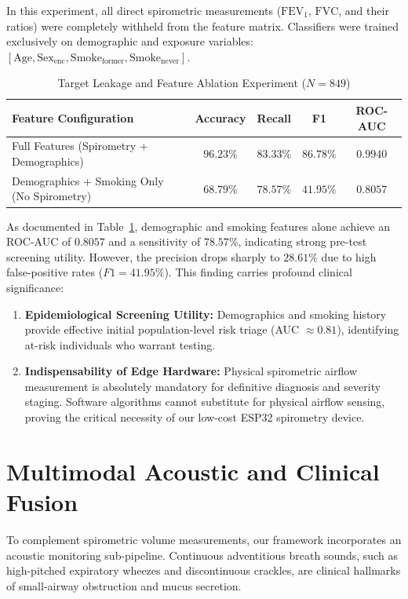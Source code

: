\documentclass[conference]{IEEEtran}
\begin{document}
In this experiment, all direct spirometric measurements ($\text{FEV}_1$, $\text{FVC}$, and their ratios) were completely withheld from the feature matrix. Classifiers were trained exclusively on demographic and exposure variables: $[\text{Age}, \text{Sex}_{\text{enc}}, \text{Smoke}_{\text{former}}, \text{Smoke}_{\text{never}}]$.

\begin{table}[h]
\caption{Target Leakage and Feature Ablation Experiment ($N=849$)}
\label{tab:leakage}
\centering
\begin{tabular}{lcccc}
\toprule
\textbf{Feature Configuration} & \textbf{Accuracy} & \textbf{Recall} & \textbf{F1} & \textbf{ROC-AUC} \\
\midrule
Full Features (Spirometry + Demographics) & $96.23\%$ & $83.33\%$ & $86.78\%$ & $0.9940$ \\
Demographics + Smoking Only (No Spirometry) & $68.79\%$ & $78.57\%$ & $41.95\%$ & $0.8057$ \\
\bottomrule
\end{tabular}
\end{table}

As documented in Table~\ref{tab:leakage}, demographic and smoking features alone achieve an ROC-AUC of $0.8057$ and a sensitivity of $78.57\%$, indicating strong pre-test screening utility. However, the precision drops sharply to $28.61\%$ due to high false-positive rates ($F1 = 41.95\%$). This finding carries profound clinical significance:
\begin{enumerate}
    \item \textbf{Epidemiological Screening Utility:} Demographics and smoking history provide effective initial population-level risk triage (AUC $\approx 0.81$), identifying at-risk individuals who warrant testing.
    \item \textbf{Indispensability of Edge Hardware:} Physical spirometric airflow measurement is absolutely mandatory for definitive diagnosis and severity staging. Software algorithms cannot substitute for physical airflow sensing, proving the critical necessity of our low-cost ESP32 spirometry device.
\end{enumerate}

\section{Multimodal Acoustic and Clinical Fusion}
To complement spirometric volume measurements, our framework incorporates an acoustic monitoring sub-pipeline. Continuous adventitious breath sounds, such as high-pitched expiratory wheezes and discontinuous crackles, are clinical hallmarks of small-airway obstruction and mucus secretion.
\end{document}
